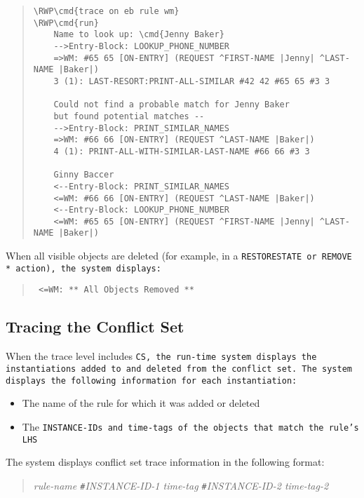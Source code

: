 \begin{quote}
\begin{Verbatim}[commandchars=\\\{\}]
\RWP\cmd{trace on eb rule wm}
\RWP\cmd{run}
    Name to look up: \cmd{Jenny Baker}
    -->Entry-Block: LOOKUP_PHONE_NUMBER
    =>WM: #65 65 [ON-ENTRY] (REQUEST ^FIRST-NAME |Jenny| ^LAST-NAME |Baker|)
    3 (1): LAST-RESORT:PRINT-ALL-SIMILAR #42 42 #65 65 #3 3

    Could not find a probable match for Jenny Baker
    but found potential matches --
    -->Entry-Block: PRINT_SIMILAR_NAMES
    =>WM: #66 66 [ON-ENTRY] (REQUEST ^LAST-NAME |Baker|)
    4 (1): PRINT-ALL-WITH-SIMILAR-LAST-NAME #66 66 #3 3

    Ginny Baccer
    <--Entry-Block: PRINT_SIMILAR_NAMES
    <=WM: #66 66 [ON-ENTRY] (REQUEST ^LAST-NAME |Baker|)
    <--Entry-Block: LOOKUP_PHONE_NUMBER
    <=WM: #65 65 [ON-ENTRY] (REQUEST ^FIRST-NAME |Jenny| ^LAST-NAME |Baker|)
\end{Verbatim}
\end{quote}

When all visible objects are deleted (for example, in a
\tt{RESTORESTATE} or \tt{REMOVE *} action), the system displays:

\begin{quote}
\begin{verbatim}
 <=WM: ** All Objects Removed **
\end{verbatim}
\end{quote}

\subsection{Tracing the Conflict Set}

When the trace level includes \tt{CS}, the run-time system displays
the instantiations added to and deleted from the conflict set.  The
system displays the following information for each instantiation:

\begin{itemize}
\item The name of the rule for which it was added or deleted
\item The \tt{INSTANCE-ID}s and time-tags of the objects that match
  the rule's LHS
\end{itemize}

The system displays conflict set trace information in the following
format:

\begin{quote}
  \it{rule-name} \verb|#|\it{INSTANCE-ID-1} \it{time-tag}
  \verb|#|\it{INSTANCE-ID-2} \it{time-tag-2}
\end{quote}

